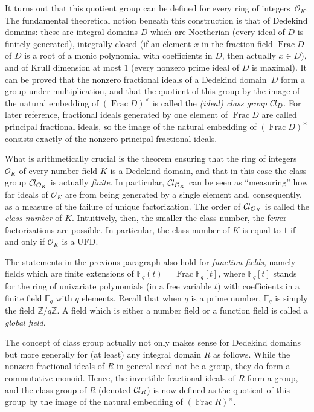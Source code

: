 \documentclass[sn-mathphys]{sn-jnl}%
\newcommand*{\OK}[1][K]{\mathcal{O}_{#1}}
\newcommand*{\Cl}{\mathcal{C}\kern-.075em l}
\newcommand*{\Fq}[1][q]{\mathbb{F}_{#1}}
\renewcommand{\Z}{\mathbb{Z}}
\DeclareMathOperator{\Frac}{Frac}
\begin{document}
It turns out that this quotient group can be defined for every ring of integers~$\OK$.
The fundamental theoretical notion beneath this construction is that of Dedekind domains: these are integral domains $D$ which are Noetherian (every ideal of $D$ is finitely generated), integrally closed (if an element $x$ in the fraction field $\Frac D$ of $D$ is a root of a monic polynomial with coefficients in $D$, then actually $x \in D$), and of Krull dimension at most $1$ (every nonzero prime ideal of $D$ is maximal).
It can be proved that the nonzero fractional ideals of a Dedekind domain~$D$
form a group under multiplication, and that the quotient of this group by the image of the natural embedding of $(\Frac D)^\times$ is called the \emph{\textup{(}ideal\textup{)} class group} $\Cl_{D}$.
For later reference, fractional ideals generated by one element of $\Frac D$ are called principal fractional ideals, so the image of the natural embedding of $(\Frac D)^\times$ consists exactly of the nonzero principal fractional ideals.

What is arithmetically crucial is the theorem ensuring that the ring of integers $\OK$ of every number field $K$ is a Dedekind domain,
and that in this case the class group $\Cl_{\OK}$ is actually \emph{finite}.
In particular, $\Cl_{\OK}$ can be seen as ``measuring'' how far ideals of $\OK$ are from being generated by a single element and,
consequently, as a measure of the failure of unique factorization.
The order of $\Cl_{\OK}$ is called the \emph{class number} of $K$.
Intuitively, then, the smaller the class number, the fewer factorizations are possible.
In particular, the class number of $K$ is equal to $1$ if and only if $\OK$ is a UFD.

The statements in the previous paragraph also hold for \emph{function fields}, namely fields which are finite extensions of $\Fq(t) = \Frac \Fq[q][t]$, where $\Fq[q][t]$ stands for the ring of univariate polynomials (in a free variable $t$) with coefficients in a finite field $\Fq$ with $q$ elements. Recall that when $q$ is a prime number, $\Fq$ is simply the field $\Z/q\Z$.
A field which is either a number field or a function field is called a \emph{global field}.

The concept of class group actually not only makes sense for Dedekind domains but more generally for (at least) any integral domain $R$ as follows. While the nonzero fractional ideals of $R$ in general need not be a group, they do form a commutative monoid. Hence, the invertible fractional ideals of $R$ form a group, and the class group of $R$ (denoted $\Cl_{R}$) is now defined as the quotient of this group by the image of the natural embedding of $(\Frac R)^\times$.
\end{document}
